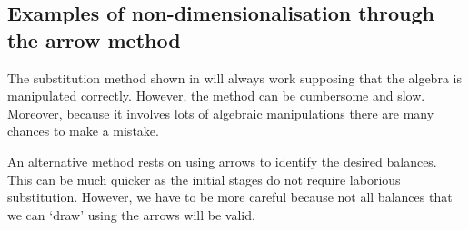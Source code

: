 
\subsection{Examples of non-dimensionalisation through the arrow method}
The substitution method shown in  will always work supposing that the algebra is manipulated correctly. However, the method can be cumbersome and slow. Moreover, because it involves lots of algebraic manipulations there are many chances to make a mistake.

An alternative method rests on using arrows to identify the desired balances. This can be much quicker as the initial stages do not require laborious substitution. However, we have to be more careful because not all balances that we can `draw' using the arrows will be valid.

